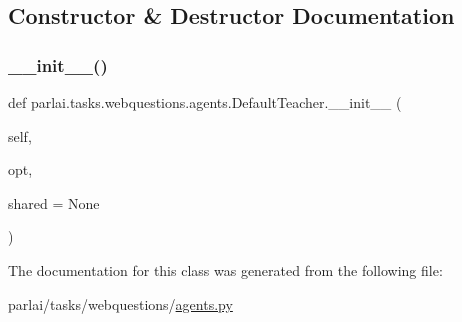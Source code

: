 \subsection{Constructor \& Destructor Documentation}
\mbox{\label{classparlai_1_1tasks_1_1webquestions_1_1agents_1_1DefaultTeacher_a5206081c0932010aa0cb6ac15eb51ed1}} 
\subsubsection{\texorpdfstring{\+\_\+\+\_\+init\+\_\+\+\_\+()}{\_\_init\_\_()}}
{\footnotesize\ttfamily def parlai.\+tasks.\+webquestions.\+agents.\+Default\+Teacher.\+\_\+\+\_\+init\+\_\+\+\_\+ (\begin{DoxyParamCaption}\item[{}]{self,  }\item[{}]{opt,  }\item[{}]{shared = {\ttfamily None} }\end{DoxyParamCaption})}



The documentation for this class was generated from the following file\+:\begin{DoxyCompactItemize}
\item 
parlai/tasks/webquestions/\hyperlink{parlai_2tasks_2webquestions_2agents_8py}{agents.\+py}\end{DoxyCompactItemize}
